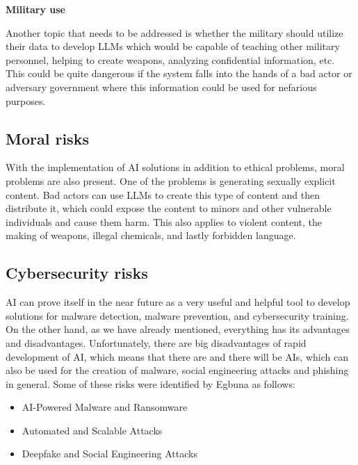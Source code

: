 \textbf{Military use}

Another topic that needs to be addressed is whether the military should utilize their data to develop LLMs which would be capable of teaching other military personnel, helping to create weapons, analyzing confidential information, etc. This could be quite dangerous if the system falls into the hands of a bad actor or adversary government where this information could be used for nefarious purposes.


\subsection{Moral risks}
With the implementation of AI solutions in addition to ethical problems, moral problems are also present. One of the problems is generating sexually explicit content. Bad actors can use LLMs to create this type of content and then distribute it, which could expose the content to minors and other vulnerable individuals and cause them harm. This also applies to violent content, the making of weapons, illegal chemicals, and lastly forbidden language.


\subsection{Cybersecurity risks}
AI can prove itself in the near future as a very useful and helpful tool to develop solutions for malware detection, malware prevention, and cybersecurity training. On the other hand, as we have already mentioned, everything has its advantages and disadvantages. Unfortunately, there are big disadvantages of rapid development of AI, which means that there are and there will be AIs, which can also be used for the creation of malware, social engineering attacks and phishing in general. Some of these risks were identified by Egbuna\cite{Princess-Egbuna_2021} as follows:

\begin{itemize}
    \item AI-Powered Malware and Ransomware
    \item Automated and Scalable Attacks
    \item Deepfake and Social Engineering Attacks
\end{itemize}

